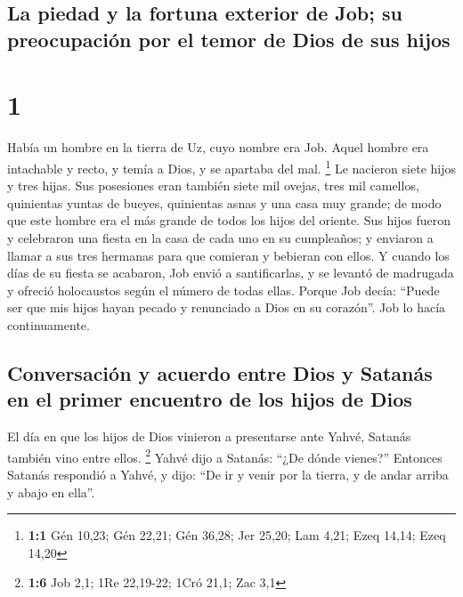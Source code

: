 \hypertarget{la-piedad-y-la-fortuna-exterior-de-job-su-preocupaciuxf3n-por-el-temor-de-dios-de-sus-hijos}{%
\subsection{La piedad y la fortuna exterior de Job; su preocupación por
el temor de Dios de sus
hijos}\label{la-piedad-y-la-fortuna-exterior-de-job-su-preocupaciuxf3n-por-el-temor-de-dios-de-sus-hijos}}

\hypertarget{section}{%
\section{1}\label{section}}

 Había un hombre en la tierra de Uz, cuyo nombre era Job.
Aquel hombre era intachable y recto, y temía a Dios, y se apartaba del
mal. \footnote{\textbf{1:1} Gén 10,23; Gén 22,21; Gén 36,28; Jer 25,20;
  Lam 4,21; Ezeq 14,14; Ezeq 14,20}  Le nacieron siete
hijos y tres hijas.  Sus posesiones eran también siete mil
ovejas, tres mil camellos, quinientas yuntas de bueyes, quinientas asnas
y una casa muy grande; de modo que este hombre era el más grande de
todos los hijos del oriente.  Sus hijos fueron y
celebraron una fiesta en la casa de cada uno en su cumpleaños; y
enviaron a llamar a sus tres hermanas para que comieran y bebieran con
ellos.  Y cuando los días de su fiesta se acabaron, Job
envió a santificarlas, y se levantó de madrugada y ofreció holocaustos
según el número de todas ellas. Porque Job decía: ``Puede ser que mis
hijos hayan pecado y renunciado a Dios en su corazón''. Job lo hacía
continuamente.

\hypertarget{conversaciuxf3n-y-acuerdo-entre-dios-y-satanuxe1s-en-el-primer-encuentro-de-los-hijos-de-dios}{%
\subsection{Conversación y acuerdo entre Dios y Satanás en el primer
encuentro de los hijos de
Dios}\label{conversaciuxf3n-y-acuerdo-entre-dios-y-satanuxe1s-en-el-primer-encuentro-de-los-hijos-de-dios}}

 El día en que los hijos de Dios vinieron a presentarse
ante Yahvé, Satanás también vino entre ellos. \footnote{\textbf{1:6} Job
  2,1; 1Re 22,19-22; 1Cró 21,1; Zac 3,1}  Yahvé dijo a
Satanás: ``¿De dónde vienes?'' Entonces Satanás respondió a Yahvé, y
dijo: ``De ir y venir por la tierra, y de andar arriba y abajo en
ella''.

